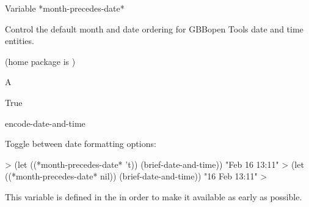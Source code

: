 \documentclass[10pt,twoside,english,pdftex]{article}
\begin{document}
\W\entities
\T\clearpage


\begin{functiondoc}{Variable}%
{*month-precedes-date*}{}%

\fnsyntax

\fnpurpose Control the default month and date ordering for GBBopen Tools date
and time entities.

\fnpackage {} (home package is )

\fnmodule {}

\fnvaluetype A 

\fninitialvalue True

\begin{alsos}{encode-date-and-time}
\end{alsos}

\fnexamples
Toggle between date formatting options:
%
\W\supp
\begin{example}
  > (let ((*month-precedes-date* 't))
      (brief-date-and-time))
  "Feb 16 13:11"
  > (let ((*month-precedes-date* nil))
      (brief-date-and-time))
  "16 Feb 13:11"
  >
\end{example}

\fnnote
{}%
%
%
This variable is defined in the  
in order to make it available as early as possible.

\end{functiondoc}

\end{document}
